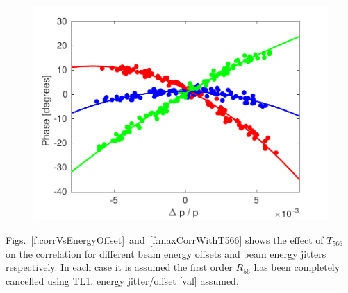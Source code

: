 \documentclass[%
 reprint,
 superscriptaddress,
 amsmath,
 amssymb,
 prstab,
]{revtex4-1}
\begin{document}
\begin{figure}
	\includegraphics[width=\columnwidth]{figs/prop/R56ScanGunWiggle_PhaseVsEnergy}%
	\caption{\label{f:R56ScanGunWiggle_PhaseVsEnergy}
	}
\end{figure}

Figs.~\ref{f:corrVsEnergyOffset}~and~\ref{f:maxCorrWithT566} shows the effect 
of \(T_{566}\) on the correlation for different beam energy offsets and beam 
energy jitters respectively. In each case it is assumed the first order 
\(R_{56}\) has been completely cancelled using TL1. energy jitter/offset [val] 
assumed.
\end{document}
